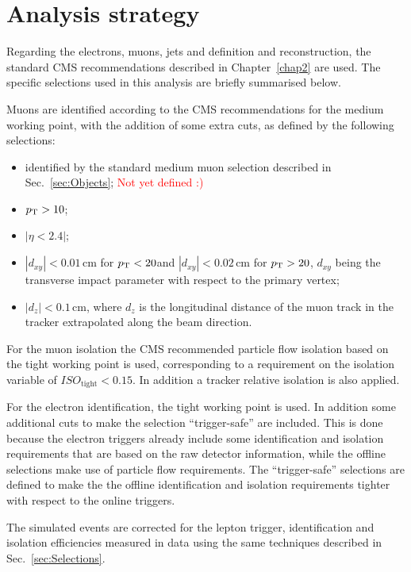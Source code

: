 \section{Analysis strategy}\label{chap5:analysis_strategy}

Regarding the electrons, muons, jets and \MET definition and reconstruction, the standard CMS recommendations described in Chapter~\ref{chap2} are used. The specific selections used in this analysis are briefly summarised below.

Muons are identified according to the CMS recommendations for the medium working point, with the addition of some extra cuts, as defined by the following selections:
\begin{itemize}
\item identified by the standard medium muon selection described in Sec.~\ref{sec:Objects}; \textcolor{red}{Not yet defined :)}
\item $p_\mathrm{T}> 10$\GeV;
\item $|\eta < 2.4|$;
\item $|d_{xy}| < 0.01$\,cm for $p_\mathrm{T} < 20$\GeV and $|d_{xy}| < 0.02$\,cm for $p_\mathrm{T} > 20$\GeV, $d_{xy}$ being the transverse impact parameter with respect to the primary vertex;
\item $|d_{z}| < 0.1$\,cm, where $d_z$ is the longitudinal distance of the muon track in the tracker extrapolated along the beam direction.
\end{itemize}

For the muon isolation the CMS recommended particle flow isolation based on the tight working point is used, corresponding to a requirement on the isolation variable of $ISO_\mathrm{tight} < 0.15$. In addition a tracker relative isolation is also applied.

For the electron identification, the tight working point is used. In addition some additional cuts to make the selection ``trigger-safe'' are included. This is done because the electron triggers already include some identification and isolation requirements that are based on the raw detector information, while the offline selections make use of particle flow requirements. The ``trigger-safe'' selections are defined to make the the offline identification and isolation requirements tighter with respect to the online triggers.

The simulated events are corrected for the lepton trigger, identification and isolation efficiencies measured in data using the same techniques described in Sec.~\ref{sec:Selections}.

